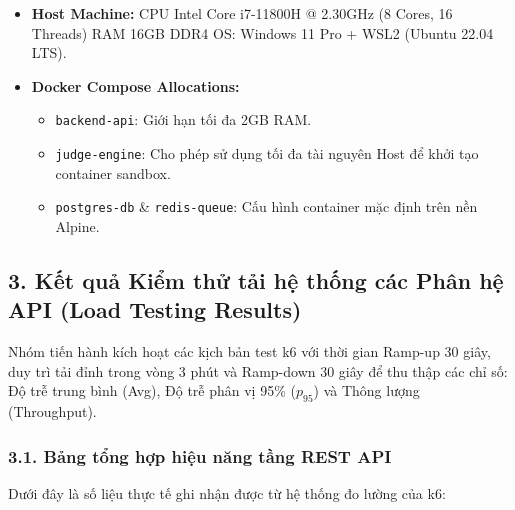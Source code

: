 \documentclass[12pt,a4paper]{article}
\renewcommand{\_}{\BreakableUnderscore}
\providecommand{\tightlist}{%
  \setlength{\itemsep}{0pt}\setlength{\parskip}{0pt}}
\begin{document}
\begin{itemize}
\tightlist
\item
  \textbf{Host Machine:} CPU Intel Core i7-11800H @ 2.30GHz (8 Cores, 16 Threads) \textbar{} RAM 16GB DDR4 \textbar{} OS: Windows 11 Pro + WSL2 (Ubuntu 22.04 LTS).
\item
  \textbf{Docker Compose Allocations:}

  \begin{itemize}
  \tightlist
  \item
    \texttt{backend-api}: Giới hạn tối đa 2GB RAM.
  \item
    \texttt{judge-engine}: Cho phép sử dụng tối đa tài nguyên Host để khởi tạo container sandbox.
  \item
    \texttt{postgres-db} \& \texttt{redis-queue}: Cấu hình container mặc định trên nền Alpine.
  \end{itemize}
\end{itemize}

\subsection{3. Kết quả Kiểm thử tải hệ thống các Phân hệ API (Load Testing Results)}

Nhóm tiến hành kích hoạt các kịch bản test k6 với thời gian Ramp-up 30 giây, duy trì tải đỉnh trong vòng 3 phút và Ramp-down 30 giây để thu thập các chỉ số: Độ trễ trung bình (Avg), Độ trễ phân vị 95\% (\(p_{95}\)) và Thông lượng (Throughput).

\subsubsection{3.1. Bảng tổng hợp hiệu năng tầng REST API}

Dưới đây là số liệu thực tế ghi nhận được từ hệ thống đo lường của k6:
\end{document}
